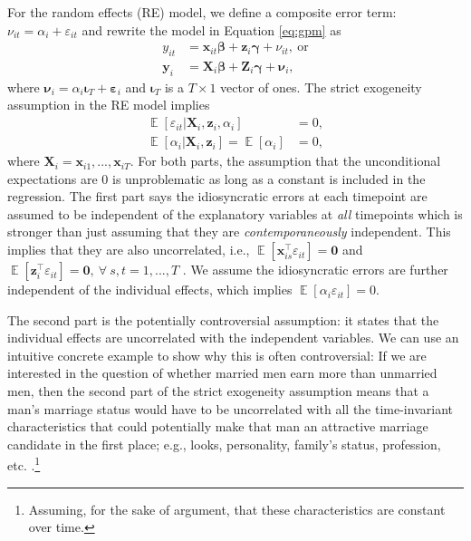 \documentclass[]{interact}
\theoremstyle{plain}%
\theoremstyle{definition}
\theoremstyle{remark}
\begin{document}
For the random effects (RE) model, we define a composite error term:
\(\nu_{it} = \alpha_{i} + \varepsilon_{it}\) and rewrite the model in
Equation \eqref{eq:gpm} as \begin{align}
y_{it} & = \bm{x}_{it}\bm{\beta} + \bm{z}_{i}\bm{\gamma} + \nu_{it}, \ \text{or} \\
\bm{y}_{i} & = \bm{X}_{i}\bm{\beta} + \bm{Z}_{i}\bm{\gamma} + \bm{\nu}_{i},
\end{align} where
\(\bm{\nu}_{i} = \alpha_{i} \bm{\iota}_{T} + \bm{\varepsilon}_{i}\) and
\(\bm{\iota}_{T}\) is a \(T \times 1\) vector of ones. The strict
exogeneity assumption in the RE model implies \begin{align}
\mathop{\mathrm{\mathbb{E}}}[\varepsilon_{it} | \bm{X}_{i}, \bm{z}_{i}, \alpha_{i}] & = 0, \\
\mathop{\mathrm{\mathbb{E}}}[\alpha_{i} |\bm{X}_{i}, \bm{z}_{i}] = \mathop{\mathrm{\mathbb{E}}}[\alpha_{i}] & = 0,
\end{align} where \(\bm{X}_{i} = \bm{x}_{i1}, ..., \bm{x}_{iT}\). For
both parts, the assumption that the unconditional expectations are 0 is
unproblematic as long as a constant is included in the regression. The
first part says the idiosyncratic errors at each timepoint are assumed
to be independent of the explanatory variables at \textit{all}
timepoints which is stronger than just assuming that they are
\textit{contemporaneously} independent. This implies that they are also
uncorrelated, i.e.,
\(\mathop{\mathrm{\mathbb{E}}}[\bm{x}_{is}^{\intercal}\varepsilon_{it}] = \bm{0}\)
and
\(\mathop{\mathrm{\mathbb{E}}}[\bm{z}_{i}^{\intercal}\varepsilon_{it}] = \bm{0}, \ \forall \ s, t = 1, ..., T\)
\citep{Wooldridge2002, Bruederl2015}. We assume the idiosyncratic errors
are further independent of the individual effects, which implies
\(\mathop{\mathrm{\mathbb{E}}}[\alpha_{i}\varepsilon_{it}] = 0\).

The second part is the potentially controversial assumption: it states
that the individual effects are uncorrelated with the independent
variables. We can use an intuitive concrete example to show why this is
often controversial: If we are interested in the question of whether
married men earn more than unmarried men, then the second part of the
strict exogeneity assumption means that a man's marriage status would
have to be uncorrelated with all the time-invariant characteristics that
could potentially make that man an attractive marriage candidate in the
first place; e.g., looks, personality, family's status, profession, etc.
\citep{Bruederl2015}.\footnote{Assuming, for the sake of argument, that
  these characteristics are constant over time.}
\end{document}
